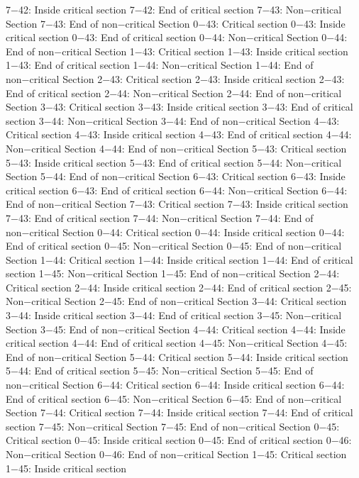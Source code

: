 7−42: Inside critical section
7−42: End of critical section
7−43: Non−critical Section
7−43: End of non−critical Section
0−43: Critical section
0−43: Inside critical section
0−43: End of critical section
0−44: Non−critical Section
0−44: End of non−critical Section
1−43: Critical section
1−43: Inside critical section
1−43: End of critical section
1−44: Non−critical Section
1−44: End of non−critical Section
2−43: Critical section
2−43: Inside critical section
2−43: End of critical section
2−44: Non−critical Section
2−44: End of non−critical Section
3−43: Critical section
3−43: Inside critical section
3−43: End of critical section
3−44: Non−critical Section
3−44: End of non−critical Section
4−43: Critical section
4−43: Inside critical section
4−43: End of critical section
4−44: Non−critical Section
4−44: End of non−critical Section
5−43: Critical section
5−43: Inside critical section
5−43: End of critical section
5−44: Non−critical Section
5−44: End of non−critical Section
6−43: Critical section
6−43: Inside critical section
6−43: End of critical section
6−44: Non−critical Section
6−44: End of non−critical Section
7−43: Critical section
7−43: Inside critical section
7−43: End of critical section
7−44: Non−critical Section
7−44: End of non−critical Section
0−44: Critical section
0−44: Inside critical section
0−44: End of critical section
0−45: Non−critical Section
0−45: End of non−critical Section
1−44: Critical section
1−44: Inside critical section
1−44: End of critical section
1−45: Non−critical Section
1−45: End of non−critical Section
2−44: Critical section
2−44: Inside critical section
2−44: End of critical section
2−45: Non−critical Section
2−45: End of non−critical Section
3−44: Critical section
3−44: Inside critical section
3−44: End of critical section
3−45: Non−critical Section
3−45: End of non−critical Section
4−44: Critical section
4−44: Inside critical section
4−44: End of critical section
4−45: Non−critical Section
4−45: End of non−critical Section
5−44: Critical section
5−44: Inside critical section
5−44: End of critical section
5−45: Non−critical Section
5−45: End of non−critical Section
6−44: Critical section
6−44: Inside critical section
6−44: End of critical section
6−45: Non−critical Section
6−45: End of non−critical Section
7−44: Critical section
7−44: Inside critical section
7−44: End of critical section
7−45: Non−critical Section
7−45: End of non−critical Section
0−45: Critical section
0−45: Inside critical section
0−45: End of critical section
0−46: Non−critical Section
0−46: End of non−critical Section
1−45: Critical section
1−45: Inside critical section

